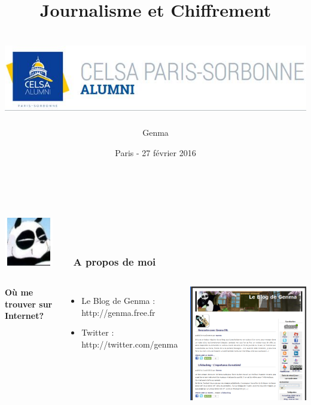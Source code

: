 \documentclass{beamer}
\title[Journalisme et Chiffrement]{Journalisme et Chiffrement
\\~\\
\includegraphics[scale=0.4]{./images/CELSA.jpg}
}
\date{Paris - 27 février 2016}
\author{Genma}
\begin{document}
\begin{frame}
	\titlepage
	\vfill
	\begin{center}
		\\[2.5ex]
		{\tiny\CcNote{\CcLongnameByNcSa}}
		\vspace*{-2.5ex}
	\end{center}
\end{frame}

\begin{frame}
\frametitle{\includegraphics[scale=0.4]{./images/Genma.jpg} \ \ \  A propos de moi  }
\begin{columns}[c] 
\textbf{Où me trouver sur Internet?}
\begin{itemize}
\item Le Blog de Genma : http://genma.free.fr
\item Twitter : http://twitter.com/genma
\end{itemize}
\includegraphics[scale=0.40] {./images/blog.png} 
\end{columns}
\end{frame}
\end{document}
